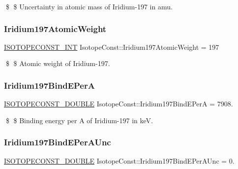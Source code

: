 \$ \$ Uncertainty in atomic mass of Iridium-\/197 in amu. \mbox{\label{group___isotope_const-_iridium-_ir197_ga167d98fc52a5fe8faa4844dfba08ed00}} 
\subsubsection{\texorpdfstring{Iridium197\+Atomic\+Weight}{Iridium197AtomicWeight}}
{\footnotesize\ttfamily \mbox{\hyperlink{group___isotope_const-_macros_ga5f18360b3e99483a35c32d789e62621c}{I\+S\+O\+T\+O\+P\+E\+C\+O\+N\+S\+T\+\_\+\+I\+NT}} Isotope\+Const\+::\+Iridium197\+Atomic\+Weight = 197}

\$ \$ Atomic weight of Iridium-\/197. \mbox{\label{group___isotope_const-_iridium-_ir197_ga7de2b9491dd5efbd504d23398fed8971}} 
\subsubsection{\texorpdfstring{Iridium197\+Bind\+E\+PerA}{Iridium197BindEPerA}}
{\footnotesize\ttfamily \mbox{\hyperlink{group___isotope_const-_macros_ga8f45a7272ce02c0b4c65c44636ed719a}{I\+S\+O\+T\+O\+P\+E\+C\+O\+N\+S\+T\+\_\+\+D\+O\+U\+B\+LE}} Isotope\+Const\+::\+Iridium197\+Bind\+E\+PerA = 7908.}

\$ \$ Binding energy per A of Iridium-\/197 in keV. \mbox{\label{group___isotope_const-_iridium-_ir197_ga760dda32cb426cc2f9fa6b489da69a6d}} 
\subsubsection{\texorpdfstring{Iridium197\+Bind\+E\+Per\+A\+Unc}{Iridium197BindEPerAUnc}}
{\footnotesize\ttfamily \mbox{\hyperlink{group___isotope_const-_macros_ga8f45a7272ce02c0b4c65c44636ed719a}{I\+S\+O\+T\+O\+P\+E\+C\+O\+N\+S\+T\+\_\+\+D\+O\+U\+B\+LE}} Isotope\+Const\+::\+Iridium197\+Bind\+E\+Per\+A\+Unc = 0.}

